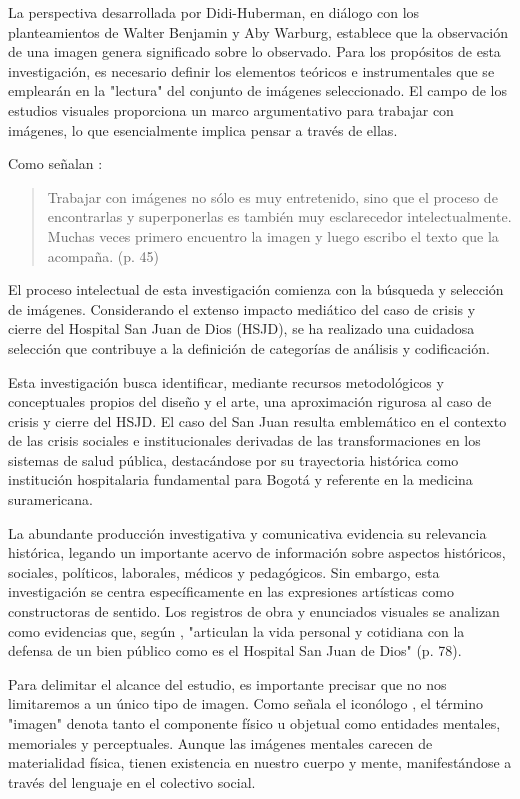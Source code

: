 La perspectiva desarrollada por Didi-Huberman, en diálogo con los planteamientos de Walter Benjamin y Aby Warburg, establece que la observación de una imagen genera significado sobre lo observado. Para los propósitos de esta investigación, es necesario definir los elementos teóricos e instrumentales que se emplearán en la "lectura" del conjunto de imágenes seleccionado. El campo de los estudios visuales proporciona un marco argumentativo para trabajar con imágenes, lo que esencialmente implica pensar a través de ellas.


Como señalan \parencite{Perez2010}:
\begin{quote}
Trabajar con imágenes no sólo es muy entretenido, sino que el proceso de encontrarlas y superponerlas es también muy esclarecedor intelectualmente. Muchas veces primero encuentro la imagen y luego escribo el texto que la acompaña. (p. 45)
\end{quote}

El proceso intelectual de esta investigación comienza con la búsqueda y selección de imágenes. Considerando el extenso impacto mediático del caso de crisis y cierre del Hospital San Juan de Dios (HSJD), se ha realizado una cuidadosa selección que contribuye a la definición de categorías de análisis y codificación.

Esta investigación busca identificar, mediante recursos metodológicos y conceptuales propios del diseño y el arte, una aproximación rigurosa al caso de crisis y cierre del HSJD. El caso del San Juan resulta emblemático en el contexto de las crisis sociales e institucionales derivadas de las transformaciones en los sistemas de salud pública, destacándose por su trayectoria histórica como institución hospitalaria fundamental para Bogotá y referente en la medicina suramericana.

La abundante producción investigativa y comunicativa evidencia su relevancia histórica, legando un importante acervo de información sobre aspectos históricos, sociales, políticos, laborales, médicos y pedagógicos. Sin embargo, esta investigación se centra específicamente en las expresiones artísticas como constructoras de sentido. Los registros de obra y enunciados visuales se analizan como evidencias que, según \parencite{Montejo2003}, "articulan la vida personal y cotidiana con la defensa de un bien público como es el Hospital San Juan de Dios" (p. 78).

Para delimitar el alcance del estudio, es importante precisar que no nos limitaremos a un único tipo de imagen. Como señala el iconólogo \parencite{Mitchell2005}, el término "imagen" denota tanto el componente físico u objetual como entidades mentales, memoriales y perceptuales. Aunque las imágenes mentales carecen de materialidad física, tienen existencia en nuestro cuerpo y mente, manifestándose a través del lenguaje en el colectivo social.

